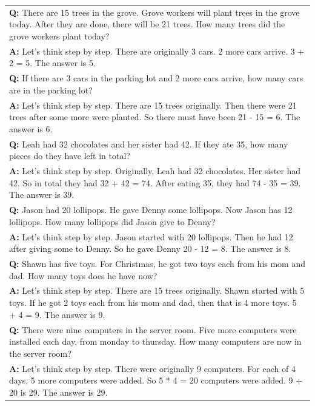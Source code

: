 \documentclass[11pt]{article}
\begin{document}
\begin{table}[ht]
    \centering
    \begin{tabularx}{\textwidth}{X}
    \toprule 
    \textbf{Q: }There are 15 trees in the grove. Grove workers will plant trees in the grove today. After they are done, there will be 21 trees. How many trees did the grove workers plant today? \\
    \textbf{A: } Let's think step by step. There are originally 3 cars. 2 more cars arrive. 3 + 2 = 5. The answer is 5. \\
    \hdashline 
    \textbf{Q: }If there are 3 cars in the parking lot and 2 more cars arrive, how many cars are in the parking lot? \\
    \textbf{A: } Let's think step by step. There are 15 trees originally. Then there were 21 trees after some more were planted. So there must have been 21 - 15 = 6. The answer is 6.\\
    \hdashline
    \textbf{Q: }Leah had 32 chocolates and her sister had 42. If they ate 35, how many pieces do they have left in total? \\
    \textbf{A: }Let's think step by step. Originally, Leah had 32 chocolates. Her sister had 42. So in total they had 32 + 42 = 74. After eating 35, they had 74 - 35 = 39. The answer is 39.\\
    \hdashline
    \textbf{Q: }Jason had 20 lollipops. He gave Denny some lollipops. Now Jason has 12 lollipops. How many lollipops did Jason give to Denny? \\
    \textbf{A: }Let's think step by step. Jason started with 20 lollipops. Then he had 12 after giving some to Denny. So he gave Denny 20 - 12 = 8. The answer is 8.\\
    \hdashline
    \textbf{Q: }Shawn has five toys. For Christmas, he got two toys each from his mom and dad. How many toys does he have now? \\
    \textbf{A: }Let's think step by step. There are 15 trees originally. Shawn started with 5 toys. If he got 2 toys each from his mom and dad, then that is 4 more toys. 5 + 4 = 9. The answer is 9.\\
    \hdashline
    \textbf{Q: }There were nine computers in the server room. Five more computers were installed each day, from monday to thursday. How many computers are now in the server room? \\
    \textbf{A: }Let's think step by step. There were originally 9 computers. For each of 4 days, 5 more computers were added. So 5 * 4 = 20 computers were added. 9 + 20 is 29. The answer is 29.\\

\end{tabularx}
\end{table}
\end{document}
